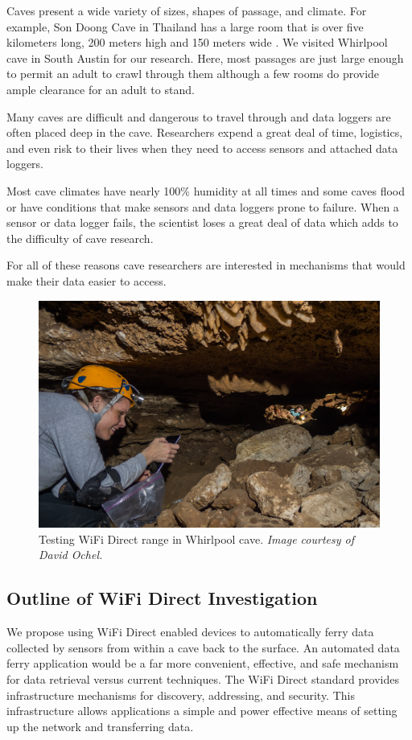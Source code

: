 \documentclass[10pt,twocolumn]{article}
\begin{document}
Caves present a wide variety of sizes, shapes of passage, and climate. 
For example, Son Doong Cave in Thailand has a large room that is over five kilometers long, 200 meters high and 150 meters wide \cite{sondoong}.
We visited Whirlpool cave in South Austin for our research.
Here, most passages are just large enough to permit an adult to crawl through them although a few rooms do provide ample clearance for an adult to stand. 

Many caves are difficult and dangerous to travel through and data loggers are often placed deep in the cave.
Researchers expend a great deal of time, logistics, and even risk to their lives when they need to access sensors and attached data loggers.

Most cave climates have nearly 100\% humidity at all times and some caves flood or have conditions that make sensors and data loggers prone to failure.
When a sensor or data logger fails, the scientist loses a great deal of data which adds to the difficulty of cave research.

For all of these reasons cave researchers are interested in mechanisms that would make their data easier to access.

\begin{figure}[t]
\includegraphics[width=\textwidth]{cavewifi2}
\caption{Testing WiFi Direct range in Whirlpool cave. \textit{Image courtesy of David Ochel.}}
\end{figure}

\subsection{Outline of WiFi Direct Investigation}
\label{sec:Outline}
We propose using WiFi Direct enabled devices to automatically ferry data collected by sensors from within a cave back to the surface.
An automated data ferry application would be a far more convenient, effective, and safe mechanism for data retrieval versus current techniques.  
The WiFi Direct standard provides infrastructure mechanisms for discovery, addressing, and security. 
This infrastructure allows applications a simple and power effective means of setting up the network and transferring data. 
\end{document}
